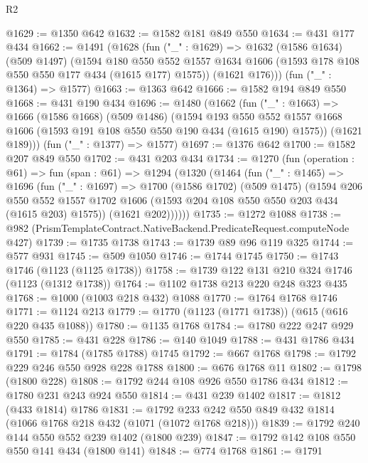 \begin{lexlean}{R2}
\begin{coremodule}
@1629 := @1350 @642
@1632 := @1582 @181 @849 @550
@1634 := @431 @177 @434
@1662 := @1491
    (@1628
      (fun ("_" : @1629) =>
      @1632
        (@1586 @1634)
        (@509 @1497)
        (@1594
          @180
          @550
          @552
          @1557
          @1634
          @1606
          (@1593 @178 @108 @550 @550 @177 @434 (@1615 @177) @1575))
        (@1621 @176)))
    (fun ("_" : @1364) => @1577)
@1663 := @1363 @642
@1666 := @1582 @194 @849 @550
@1668 := @431 @190 @434
@1696 := @1480
    (@1662
      (fun ("_" : @1663) =>
      @1666
        (@1586 @1668)
        (@509 @1486)
        (@1594
          @193
          @550
          @552
          @1557
          @1668
          @1606
          (@1593 @191 @108 @550 @550 @190 @434 (@1615 @190) @1575))
        (@1621 @189)))
    (fun ("_" : @1377) => @1577)
@1697 := @1376 @642
@1700 := @1582 @207 @849 @550
@1702 := @431 @203 @434
@1734 := @1270
    (fun (operation : @61) =>
    fun (span : @61) =>
    @1294
      (@1320
        (@1464
          (fun ("_" : @1465) =>
          @1696
            (fun ("_" : @1697) =>
            @1700
              (@1586 @1702)
              (@509 @1475)
              (@1594
                @206
                @550
                @552
                @1557
                @1702
                @1606
                (@1593 @204 @108 @550 @550 @203 @434 (@1615 @203) @1575))
              (@1621 @202))))))
@1735 := @1272 @1088
@1738 := @982 (PrismTemplateContract.NativeBackend.PredicateRequest.computeNode @427)
@1739 := @1735 @1738
@1743 := @1739 @89 @96 @119 @325
@1744 := @577 @931
@1745 := @509 @1050
@1746 := @1744 @1745
@1750 := @1743 @1746 (@1123 (@1125 @1738))
@1758 := @1739 @122 @131 @210 @324 @1746 (@1123 (@1312 @1738))
@1764 := @1102 @1738 @213 @220 @248 @323 @435
@1768 := @1000 (@1003 @218 @432) @1088
@1770 := @1764 @1768 @1746
@1771 := @1124 @213
@1779 := @1770 (@1123 (@1771 @1738)) (@615 (@616 @220 @435 @1088))
@1780 := @1135 @1768
@1784 := @1780 @222 @247 @929 @550
@1785 := @431 @228
@1786 := @140 @1049
@1788 := @431 @1786 @434
@1791 := @1784 (@1785 @1788) @1745
@1792 := @667 @1768
@1798 := @1792 @229 @246 @550 @928 @228 @1788
@1800 := @676 @1768 @11
@1802 := @1798 (@1800 @228)
@1808 := @1792 @244 @108 @926 @550 @1786 @434
@1812 := @1780 @231 @243 @924 @550
@1814 := @431 @239 @1402
@1817 := @1812 (@433 @1814) @1786
@1831 := @1792 @233 @242 @550 @849 @432 @1814 (@1066 @1768 @218 @432 (@1071 (@1072 @1768 @218)))
@1839 := @1792 @240 @144 @550 @552 @239 @1402 (@1800 @239)
@1847 := @1792 @142 @108 @550 @550 @141 @434 (@1800 @141)
@1848 := @774 @1768
@1861 := @1791

\end{coremodule}
\end{lexlean}
